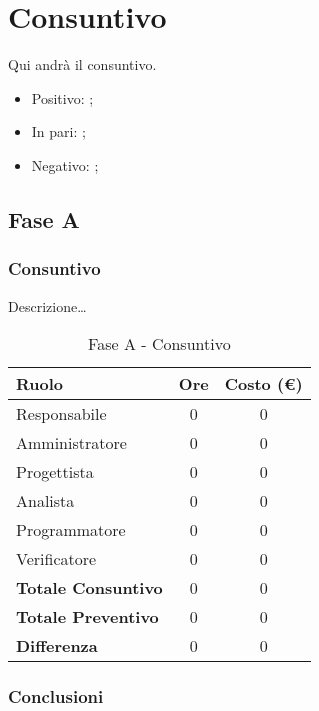 \documentclass[../PianoProgetto.tex]{subfiles}
\begin{document}
\section{Consuntivo}

	Qui andrà il consuntivo.

	\begin{itemize}
		\item Positivo: ;
		\item In pari: ;
		\item Negativo: ;
	\end{itemize}

	\subsection{Fase A}
		\subsubsection{Consuntivo}
		Descrizione\dots
		
\begin{table}[h]
		\centering
		\begin{tabular}{l * {2}{c}}
			\toprule
			\textbf{Ruolo} & \textbf{Ore} & \textbf{Costo (\euro{})} \\
			\midrule
			Responsabile &	0 & 0 \\
			Amministratore & 0 & 0 \\
			Progettista & 0 & 0 \\
			Analista & 0 & 0 \\
			Programmatore & 0 & 0 \\
			Verificatore & 0 & 0 \\
			\midrule		
			\textbf{Totale Consuntivo} & 0 & 0 \\
			\textbf{Totale Preventivo} & 0 & 0 \\
			\midrule
			\textbf{Differenza} & 0 & 0 \\
			\bottomrule
		\end{tabular}
		
		\caption{Fase A - Consuntivo}
		\label{tab:consuntivoA}
		
	\end{table}		
		
		\subsubsection{Conclusioni}	

	
\end{document}
